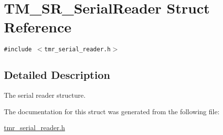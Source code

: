 \hypertarget{struct_t_m___s_r___serial_reader}{
\section{TM\_\-SR\_\-SerialReader Struct Reference}
\label{struct_t_m___s_r___serial_reader}
}
{\tt \#include $<$tmr\_\-serial\_\-reader.h$>$}



\subsection{Detailed Description}
The serial reader structure. 

The documentation for this struct was generated from the following file:\begin{CompactItemize}
\item 
\hyperlink{tmr__serial__reader_8h}{tmr\_\-serial\_\-reader.h}\end{CompactItemize}
